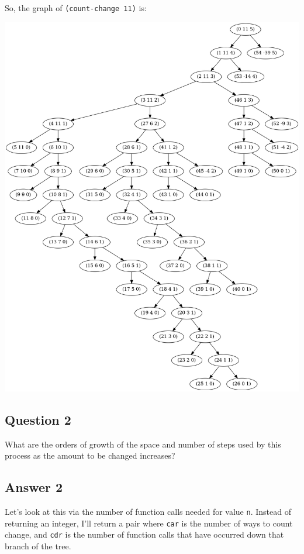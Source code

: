 \documentclass[
]{article}
\begin{document}
So, the graph of \texttt{(count-change\ 11)} is:

\includegraphics{fig/cc-11.png}

\hypertarget{question-2-1}{%
\subsection{Question 2}\label{question-2-1}}

What are the orders of growth of the space and number of steps used by
this process as the amount to be changed increases?

\hypertarget{answer-2-1}{%
\subsection{Answer 2}\label{answer-2-1}}

Let's look at this via the number of function calls needed for value
\texttt{n}. Instead of returning an integer, I'll return a pair where
\texttt{car} is the number of ways to count change, and \texttt{cdr} is
the number of function calls that have occurred down that branch of the
tree.
\end{document}
